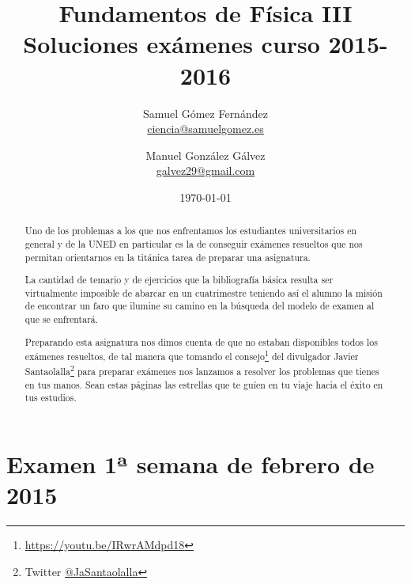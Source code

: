 \documentclass[12pt, a4paper]{article}
\title{Fundamentos de Física III \\ Soluciones exámenes curso 2015-2016}
\date{\today}
\author{
    Samuel Gómez Fernández \\ \href{mailto:ciencia@samuelgomez.es}{ciencia@samuelgomez.es}
    \and
    Manuel González Gálvez \\ \href{mailto:galvez29@gmail.com}{galvez29@gmail.com}
    }
\begin{document}
    \begin{titlepage}
    \maketitle
    \thispagestyle{empty}
    \hypersetup{pageanchor=true}
    \renewcommand*\contentsname{Contenidos}

    \tableofcontents

    \vspace{1cm}
    \begin{abstract}
        Uno de los problemas a los que nos enfrentamos los estudiantes universitarios
        en general y de la UNED en particular es la de conseguir exámenes resueltos
        que nos permitan orientarnos en la titánica tarea de preparar una asignatura.

        La cantidad de temario y de ejercicios que la bibliografía básica resulta ser
        virtualmente imposible de abarcar en un cuatrimestre teniendo así el alumno
        la misión de encontrar un faro que ilumine su camino en la búsqueda del modelo
        de examen al que se enfrentará.

        Preparando esta asignatura nos dimos cuenta de que no estaban disponibles todos los
        exámenes resueltos, de tal manera que tomando el
        consejo\footnote{\href{https://youtu.be/IRwrAMdpd18}{https://youtu.be/IRwrAMdpd18}} del divulgador
        Javier Santaolalla\footnote{Twitter \href{https://twitter.com/jasantaolalla}{@JaSantaolalla}}
        para preparar exámenes nos lanzamos a resolver los problemas que tienes
        en tus manos. Sean estas páginas las estrellas que te guíen en tu viaje
        hacia el éxito en tus estudios.
    \end{abstract}
    \end{titlepage}



    \restoregeometry

    \section{Examen 1ª semana de febrero de 2015}
\end{document}

